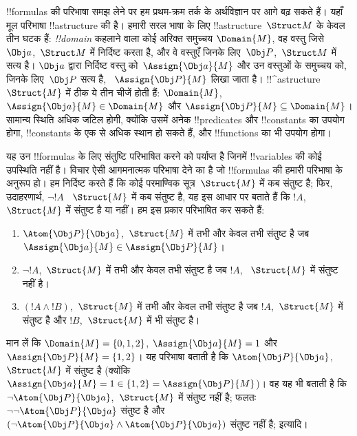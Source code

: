 \documentclass[../../../include/open-logic-section]{subfiles}
\begin{document}


!!{formula}s की परिभाषा समझ लेने पर हम प्रथम-क्रम तर्क के अर्थविज्ञान पर
आगे बढ़ सकते हैं। यहाँ मूल परिभाषा !!a{structure} की है। हमारी सरल भाषा के
लिए !!a{structure}~$\Struct M$ के केवल तीन घटक हैं: \emph{!!{domain}} कहलाने
वाला कोई अरिक्त समुच्चय $\Domain{M}$, वह वस्तु जिसे~$\Obj a$,~$\Struct M$
में निर्दिष्ट करता है, और वे वस्तुएँ जिनके लिए~$\Obj P$,~$\Struct M$ में
सत्य है। $\Obj a$ द्वारा निर्दिष्ट वस्तु को~$\Assign{\Obj a}{M}$ और उन
वस्तुओं के समुच्चय को, जिनके लिए~$\Obj P$ सत्य है,
~$\Assign{\Obj P}{M}$ लिखा जाता है। !!^a{structure}~$\Struct{M}$ में ठीक ये
तीन चीजें होती हैं: $\Domain{M}$, $\Assign{\Obj a}{M} \in
\Domain{M}$ और $\Assign{\Obj P}{M} \subseteq \Domain{M}$। सामान्य स्थिति
अधिक जटिल होगी, क्योंकि उसमें अनेक !!{predicate}s और !!{constant}s का उपयोग होगा,
!!{constant}s के एक से अधिक स्थान हो सकते हैं, और !!{function}s का भी उपयोग होगा।

यह उन !!{formula}s के लिए संतुष्टि परिभाषित करने को पर्याप्त है जिनमें
!!{variable}s की कोई उपस्थिति नहीं है। विचार ऐसी आगमनात्मक परिभाषा देने का है जो
!!{formula}s की हमारी परिभाषा के अनुरूप हो। हम निर्दिष्ट करते हैं कि कोई
परमाण्विक सूत्र~$\Struct{M}$ में कब संतुष्ट है; फिर, उदाहरणार्थ, $\lnot !A$
~$\Struct{M}$ में कब संतुष्ट है, यह इस आधार पर बताते हैं कि $!A$,
~$\Struct{M}$ में संतुष्ट है या नहीं। हम इस प्रकार परिभाषित कर सकते हैं:
\begin{enumerate}
  \item $\Atom{\Obj P}{\Obj a}$,~$\Struct{M}$ में तभी और केवल तभी संतुष्ट
  है जब $\Assign{\Obj a}{M} \in \Assign{\Obj P}{M}$।
  \item $\lnot !A$,~$\Struct{M}$ में तभी और केवल तभी संतुष्ट है जब $!A$,
  ~$\Struct{M}$ में संतुष्ट नहीं है।
  \item $(!A \land !B)$,~$\Struct{M}$ में तभी और केवल तभी संतुष्ट है जब
  $!A$,~$\Struct{M}$ में संतुष्ट है और $!B$,~$\Struct{M}$ में भी संतुष्ट है।
\end{enumerate}
मान लें कि $\Domain{M} = \{0, 1, 2\}$, $\Assign{\Obj a}{M} = 1$ और
$\Assign{\Obj P}{M} = \{1, 2\}$। यह परिभाषा बताती है कि
$\Atom{\Obj P}{\Obj a}$,~$\Struct{M}$ में संतुष्ट है (क्योंकि
$\Assign{\Obj a}{M} =  1 \in \{1,2\} = \Assign{\Obj P}{M}$)। वह यह भी
बताती है कि $\lnot \Atom{\Obj P}{\Obj a}$,~$\Struct{M}$ में संतुष्ट नहीं
है; फलतः $\lnot\lnot \Atom{\Obj P}{\Obj
a}$ संतुष्ट है और
$(\lnot \Atom{\Obj P}{\Obj a} \land \Atom{\Obj P}{\Obj a})$ संतुष्ट नहीं
है; इत्यादि।
\end{document}

